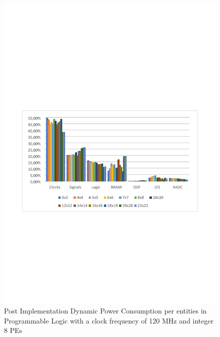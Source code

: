 \begin{figure}[!htbp]
\centering
\captionsetup{justification=centering}
\includegraphics[scale=0.7,angle=0]{./figure/graphs/power_pldyn_div_int8_freq_120mhz.pdf}
\caption{Post Implementation Dynamic Power Consumption per entities in Programmable Logic with a clock frequency of 120 MHz and integer 8 PEs}
\label{fig:dynpowint8ent120}
\end{figure}

